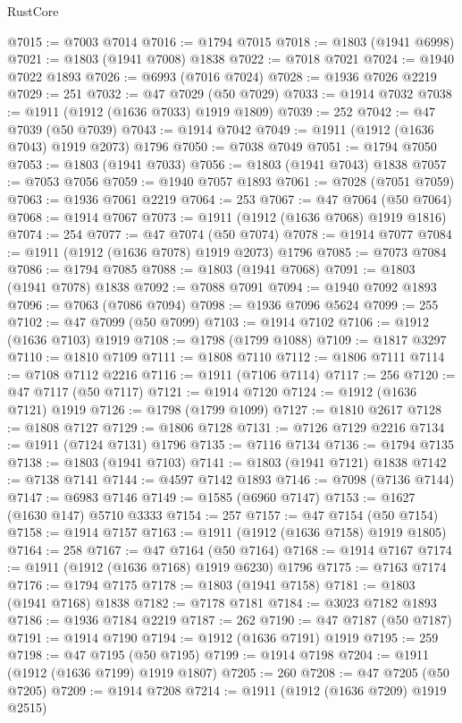 \begin{lexlean}{RustCore}
\begin{coremodule}
@7015 := @7003 @7014
@7016 := @1794 @7015
@7018 := @1803 (@1941 @6998)
@7021 := @1803 (@1941 @7008) @1838
@7022 := @7018 @7021
@7024 := @1940 @7022 @1893
@7026 := @6993 (@7016 @7024)
@7028 := @1936 @7026 @2219
@7029 := 251
@7032 := @47 @7029 (@50 @7029)
@7033 := @1914 @7032
@7038 := @1911 (@1912 (@1636 @7033) @1919 @1809)
@7039 := 252
@7042 := @47 @7039 (@50 @7039)
@7043 := @1914 @7042
@7049 := @1911 (@1912 (@1636 @7043) @1919 @2073) @1796
@7050 := @7038 @7049
@7051 := @1794 @7050
@7053 := @1803 (@1941 @7033)
@7056 := @1803 (@1941 @7043) @1838
@7057 := @7053 @7056
@7059 := @1940 @7057 @1893
@7061 := @7028 (@7051 @7059)
@7063 := @1936 @7061 @2219
@7064 := 253
@7067 := @47 @7064 (@50 @7064)
@7068 := @1914 @7067
@7073 := @1911 (@1912 (@1636 @7068) @1919 @1816)
@7074 := 254
@7077 := @47 @7074 (@50 @7074)
@7078 := @1914 @7077
@7084 := @1911 (@1912 (@1636 @7078) @1919 @2073) @1796
@7085 := @7073 @7084
@7086 := @1794 @7085
@7088 := @1803 (@1941 @7068)
@7091 := @1803 (@1941 @7078) @1838
@7092 := @7088 @7091
@7094 := @1940 @7092 @1893
@7096 := @7063 (@7086 @7094)
@7098 := @1936 @7096 @5624
@7099 := 255
@7102 := @47 @7099 (@50 @7099)
@7103 := @1914 @7102
@7106 := @1912 (@1636 @7103) @1919
@7108 := @1798 (@1799 @1088)
@7109 := @1817 @3297
@7110 := @1810 @7109
@7111 := @1808 @7110
@7112 := @1806 @7111
@7114 := @7108 @7112 @2216
@7116 := @1911 (@7106 @7114)
@7117 := 256
@7120 := @47 @7117 (@50 @7117)
@7121 := @1914 @7120
@7124 := @1912 (@1636 @7121) @1919
@7126 := @1798 (@1799 @1099)
@7127 := @1810 @2617
@7128 := @1808 @7127
@7129 := @1806 @7128
@7131 := @7126 @7129 @2216
@7134 := @1911 (@7124 @7131) @1796
@7135 := @7116 @7134
@7136 := @1794 @7135
@7138 := @1803 (@1941 @7103)
@7141 := @1803 (@1941 @7121) @1838
@7142 := @7138 @7141
@7144 := @4597 @7142 @1893
@7146 := @7098 (@7136 @7144)
@7147 := @6983 @7146
@7149 := @1585 (@6960 @7147)
@7153 := @1627 (@1630 @147) @5710 @3333
@7154 := 257
@7157 := @47 @7154 (@50 @7154)
@7158 := @1914 @7157
@7163 := @1911 (@1912 (@1636 @7158) @1919 @1805)
@7164 := 258
@7167 := @47 @7164 (@50 @7164)
@7168 := @1914 @7167
@7174 := @1911 (@1912 (@1636 @7168) @1919 @6230) @1796
@7175 := @7163 @7174
@7176 := @1794 @7175
@7178 := @1803 (@1941 @7158)
@7181 := @1803 (@1941 @7168) @1838
@7182 := @7178 @7181
@7184 := @3023 @7182 @1893
@7186 := @1936 @7184 @2219
@7187 := 262
@7190 := @47 @7187 (@50 @7187)
@7191 := @1914 @7190
@7194 := @1912 (@1636 @7191) @1919
@7195 := 259
@7198 := @47 @7195 (@50 @7195)
@7199 := @1914 @7198
@7204 := @1911 (@1912 (@1636 @7199) @1919 @1807)
@7205 := 260
@7208 := @47 @7205 (@50 @7205)
@7209 := @1914 @7208
@7214 := @1911 (@1912 (@1636 @7209) @1919 @2515)

\end{coremodule}
\end{lexlean}
